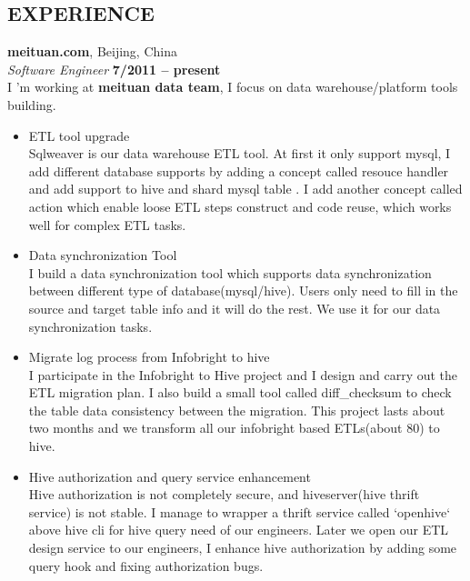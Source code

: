 \documentclass[margin,line]{resume}
\begin{document}
\begin{resume}
\sectionline

    \section{\mysidestyle \textbf{\large{E}\small{XPERIENCE}}}
    \textbf{\listing meituan.com}, Beijing, China \vspace{2mm}\\\vspace{1mm}%
    \textsl{Software Engineer} \hfill \textbf{ 7/2011 -- present}\\
    I 'm working at \textbf{meituan data team}, I focus on data warehouse/platform tools building.\vspace{0.6mm}

    \begin{itemize}[leftmargin=3mm]
        \item ETL tool upgrade\\
      Sqlweaver is our data warehouse ETL tool. At first it only support mysql, I add different database supports by adding a concept called resouce handler and add support to hive and shard mysql table . I add another concept called action which enable loose ETL steps construct and code reuse, which works well for complex ETL tasks.
        \item Data synchronization Tool\\
    I build a data synchronization tool which supports data synchronization between different type of database(mysql/hive). Users only need to fill in the source and target table info and it will do the rest. We use it for our data synchronization tasks.
        \item Migrate log process from Infobright to hive\\
        I participate in the Infobright to Hive project and I design and carry out the ETL migration plan. I also build a small tool called diff\_checksum to check the table data consistency between the migration. This project lasts about two months and we transform all our infobright based ETLs(about 80) to hive.
        \item Hive authorization and query service enhancement\\
        Hive authorization is not completely secure, and hiveserver(hive thrift service) is not stable. I manage to wrapper a thrift service called `openhive` above hive cli for hive query need of our engineers. Later we open our ETL design service to our engineers, I enhance hive authorization by adding some query hook and fixing authorization bugs.


\end{itemize}
\end{resume}
\end{document}
